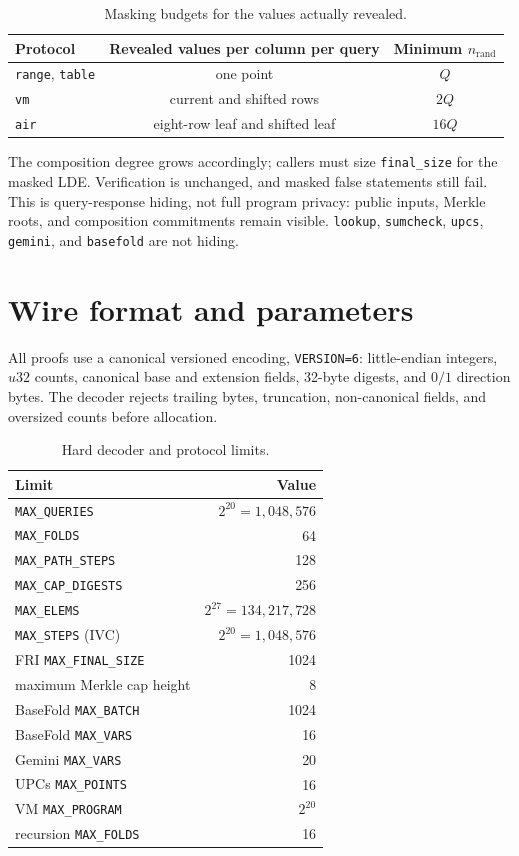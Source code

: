 \documentclass[11pt,a4paper]{article}
\begin{document}
\begin{table}[h]
\centering
\small
\begin{tabular}{@{}lcc@{}}
\toprule
Protocol & Revealed values per column per query & Minimum $n_{\mathrm{rand}}$ \\
\midrule
\texttt{range}, \texttt{table} & one point & $Q$ \\
\texttt{vm} & current and shifted rows & $2Q$ \\
\texttt{air} & eight-row leaf and shifted leaf & $16Q$ \\
\bottomrule
\end{tabular}
\caption{Masking budgets for the values actually revealed.}
\end{table}

The composition degree grows accordingly; callers must size
\texttt{final\_size} for the masked LDE. Verification is unchanged, and
masked false statements still fail. This is query-response hiding, not full
program privacy: public inputs, Merkle roots, and composition commitments
remain visible. \texttt{lookup}, \texttt{sumcheck}, \texttt{upcs},
\texttt{gemini}, and \texttt{basefold} are not hiding.

\section{Wire format and parameters}

All proofs use a canonical versioned encoding, \texttt{VERSION=6}:
little-endian integers, $u32$ counts, canonical base and extension fields,
32-byte digests, and $0/1$ direction bytes. The decoder rejects trailing
bytes, truncation, non-canonical fields, and oversized counts before
allocation.

\begin{table}[h]
\centering
\small
\begin{tabular}{@{}lr@{}}
\toprule
Limit & Value \\
\midrule
\texttt{MAX\_QUERIES} & $2^{20}=1{,}048{,}576$ \\
\texttt{MAX\_FOLDS} & 64 \\
\texttt{MAX\_PATH\_STEPS} & 128 \\
\texttt{MAX\_CAP\_DIGESTS} & 256 \\
\texttt{MAX\_ELEMS} & $2^{27}=134{,}217{,}728$ \\
\texttt{MAX\_STEPS} (IVC) & $2^{20}=1{,}048{,}576$ \\
FRI \texttt{MAX\_FINAL\_SIZE} & 1024 \\
maximum Merkle cap height & 8 \\
BaseFold \texttt{MAX\_BATCH} & 1024 \\
BaseFold \texttt{MAX\_VARS} & 16 \\
Gemini \texttt{MAX\_VARS} & 20 \\
UPCs \texttt{MAX\_POINTS} & 16 \\
VM \texttt{MAX\_PROGRAM} & $2^{20}$ \\
recursion \texttt{MAX\_FOLDS} & 16 \\
\bottomrule
\end{tabular}
\caption{Hard decoder and protocol limits.}
\end{table}
\end{document}
